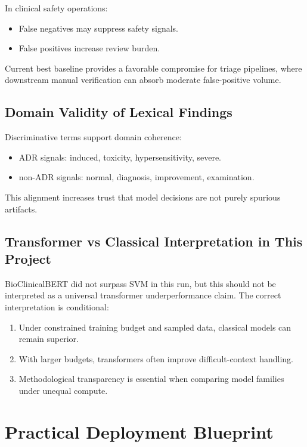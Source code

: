 \documentclass[11pt]{article}
\begin{document}
In clinical safety operations:


\begin{itemize}
  \item False negatives may suppress safety signals.
  \item False positives increase review burden.
\end{itemize}

Current best baseline provides a favorable compromise for triage pipelines, where downstream manual verification can absorb moderate false-positive volume.


\subsection{Domain Validity of Lexical Findings}

Discriminative terms support domain coherence:


\begin{itemize}
  \item ADR signals: induced, toxicity, hypersensitivity, severe.
  \item non-ADR signals: normal, diagnosis, improvement, examination.
\end{itemize}

This alignment increases trust that model decisions are not purely spurious artifacts.


\subsection{Transformer vs Classical Interpretation in This Project}

BioClinicalBERT did not surpass SVM in this run, but this should not be interpreted as a universal transformer underperformance claim. The correct interpretation is conditional:


\begin{enumerate}
  \item Under constrained training budget and sampled data, classical models can remain superior.
  \item With larger budgets, transformers often improve difficult-context handling.
  \item Methodological transparency is essential when comparing model families under unequal compute.
\end{enumerate}

\section{Practical Deployment Blueprint}
\end{document}
